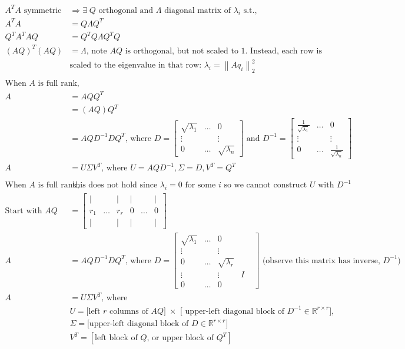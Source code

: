 \documentclass{article}
\newcommand{\norm}[2]{\left\lVert#1\right\rVert_#2}
\begin{document}
\begin{align*}
    A^TA \textrm{ symmetric} &\Rightarrow \exists \; Q \textrm{ orthogonal and } \Lambda \textrm{ diagonal matrix of $\lambda_i$ s.t., }\\
    A^TA & = Q\Lambda Q^T\\
    Q^TA^TAQ & = Q^TQ\Lambda Q^TQ\\
    (AQ)^T(AQ) & = \Lambda \textrm{, note $AQ$ is orthogonal, but not scaled to 1. Instead, each row is} \\
    &\textrm{scaled to the eigenvalue in that row: }\lambda_i  = \norm{Aq_i}{2}^2\\
    \\
    \textrm{When $A$ is full rank,}&\\
    A &= AQQ^T\\
    &= (AQ) Q^T\\
    &= AQD^{-1}DQ^T \textrm{, where } D = \begin{bmatrix} \sqrt{\lambda_1} & \dots & 0\\ 
        \vdots & & \vdots\\ 0 & \dots & \sqrt{\lambda_n} \end{bmatrix} \textrm{ and } D^{-1} = \begin{bmatrix} \frac{1}{\sqrt{\lambda_1}} & \dots & 0\\ 
        \vdots & & \vdots\\ 0 & \dots & \frac{1}{\sqrt{\lambda_n}} \end{bmatrix}\\
    A &= U\Sigma V^T \textrm{, where } U  = AQD^{-1}, \Sigma = D, V^T = Q^T\\
    \\
    \textrm{When $A$ is full rank,}&\textrm{ this does not hold since $\lambda_i = 0$ for some $i$ so we cannot construct $U$ with $D^{-1}$}\\
    \textrm{Start with } AQ &= \begin{bmatrix} \vert & & \vert & \vert & & \vert\\ 
        r_1 & \dots & r_r & 0 & \dots & 0\\
        \vert & & \vert & \vert & & \vert\end{bmatrix}\\
        A &= AQD^{-1}DQ^T \textrm{, where } D = \begin{bmatrix} \sqrt{\lambda_1} & \dots & 0 \\ 
        \vdots & & \vdots\\ 0 & \dots & \sqrt{\lambda_r} & & \\ 
        \vdots & & \vdots & I\\
        0 & \dots & 0 \end{bmatrix} \textrm{ (observe this matrix has inverse, $D^{-1}$)}\\
    A &= U\Sigma V^T \textrm{, where }\\
    &U  = \textrm{[left $r$ columns of $AQ] \; \times$ [ upper-left diagonal block of $D^{-1} \in \mathbb{R}^{r\times r}$], }\\
    &\Sigma = \textrm{[upper-left diagonal block of } D \in \mathbb{R}^{r\times r}]\\
    &V^T = [\textrm{left block of $Q$, or upper block of $Q^T$}]
\end{align*}
\end{document}
